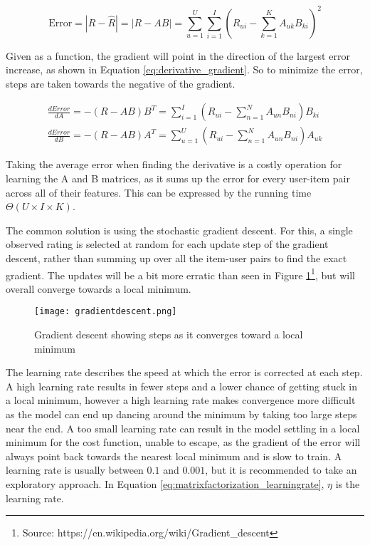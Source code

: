 \begin{equation}\label{eq:gradient_descent_error}
\text{Error} = |R-\hat{R}| = |R - AB| = \sum_{u=1}^{U}\sum_{i=1}^{I}\left (R_{ui}- \sum_{k=1}^{K} A_{uk}B_{ki} \right )^2
\end{equation}

Given as a function, the gradient will point in the direction of the largest error increase, as shown in Equation \ref{eq:derivative_gradient}. So to minimize the error, steps are taken towards the negative of the gradient.

\begin{equation}\label{eq:derivative_gradient}
	\begin{split}
	\frac{dError}{dA}=-(R-AB)B^T = \sum_{i=1}^{I}(R_{ui} - \sum_{n=1}^{N} A_{un}B_{ni})B_{ki}
	\\
	\frac{dError}{dB}=-(R-AB)A^T = \sum_{u=1}^{U}(R_{ui} - \sum_{n=1}^{N} A_{un}B_{ni})A_{uk}
	\end{split}
\end{equation}

Taking the average error when finding the derivative is a costly operation for learning the A and B matrices, as it sums up the error for every user-item pair across all of their features. This can be expressed by the running time $\Theta(U\times I \times K)$.

The common solution is using the stochastic gradient descent. For this, a single observed rating is selected at random for each update step of the gradient descent, rather than summing up over all the item-user pairs to find the exact gradient. The updates will be a bit more erratic than seen in Figure \ref{fig:gradientDescent}\footnote{Source: https://en.wikipedia.org/wiki/Gradient\_descent\label{ftn:wikifigure}}, but will overall converge towards a local minimum.

\begin{figure}
	\centering
	\texttt{[image: gradientdescent.png]}
	\caption{Gradient descent showing steps as it converges toward a local minimum}
	\label{fig:gradientDescent}
\end{figure}

The learning rate describes the speed at which the error is corrected at each step. A high learning rate results in fewer steps and a lower chance of getting stuck in a local minimum, however a high learning rate makes convergence more difficult as the model can end up dancing around the minimum by taking too large steps near the end. A too small learning rate can result in the model settling in a local minimum for the cost function, unable to escape, as the gradient of the error will always point back towards the nearest local minimum and is slow to train. A learning rate is usually between $0.1$ and $0.001$, but it is recommended to take an exploratory approach. In Equation \ref{eq:matrixfactorization_learningrate}, $\eta$ is the learning rate.

